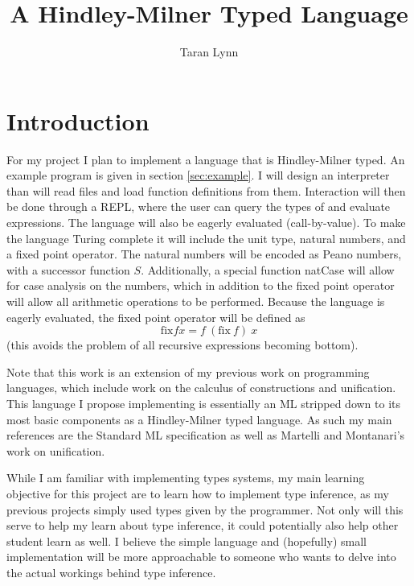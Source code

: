 \documentclass[12pt]{article}
\title{A Hindley-Milner Typed Language}
\author{Taran Lynn}
\begin{document}
\maketitle


\section{Introduction}

For my project I plan to implement a language that is Hindley-Milner
typed.
An example program is given in section \ref{sec:example}.
I will design an interpreter than will read files and load function
definitions from them.
Interaction will then be done through a REPL, where the user can query
the types of and evaluate expressions.
The language will also be eagerly evaluated (call-by-value).
To make the language Turing complete it will include the unit type,
natural numbers, and a fixed point operator.
The natural numbers will be encoded as Peano numbers, with a successor
function $S$.
Additionally, a special function natCase will allow for case analysis
on the numbers, which in addition to the fixed point operator will
allow all arithmetic operations to be performed.
Because the language is eagerly evaluated, the fixed point operator
will be defined as
$$\mathrm{fix} f x = f~(\mathrm{fix}~f)~x$$
(this avoids the problem of all recursive expressions becoming
bottom).

Note that this work is an extension of my previous work on programming
languages, which include work on the calculus of constructions and
unification\cite{ttyped,tplpl}.
This language I propose implementing is essentially an ML stripped
down to its most basic components as a Hindley-Milner typed language.
As such my main references are the Standard ML
specification\cite{Milner1997TheDO} as well as Martelli and
Montanari's work on unification\cite{Martelli1982AnEU}.

While I am familiar with implementing types systems, my main learning
objective for this project are to learn how to implement type
inference, as my previous projects simply used types given by the
programmer.
Not only will this serve to help my learn about type inference, it
could potentially also help other student learn as well.
I believe the simple language and (hopefully) small implementation
will be more approachable to someone who wants to delve into the
actual workings behind type inference.
\end{document}
